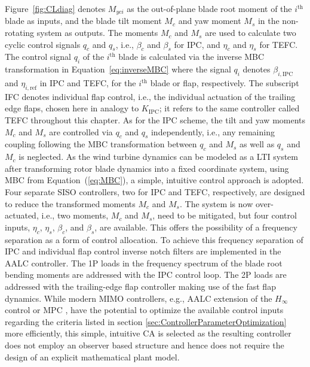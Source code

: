 Figure~\ref{fig:CLdiag} denotes $M_{yci}$ as the out-of-plane blade root moment of the $i^{\text{th}}$ blade as inputs, and the blade tilt moment $M_c$ and yaw moment $M_s$ in the non-rotating system as outputs. The moments $M_c$ and $M_s$ are used to calculate two cyclic control signals $q_c$ and $q_s$, i.e., $\beta_c$ and $\beta_s$ for IPC, and $\eta_c$ and $\eta_s$ for TEFC. The control signal $q_i$ of the $i^{\text{th}}$ blade is calculated via the inverse MBC transformation in Equation~\eqref{eq:inverseMBC} 
where the signal $q_i$ denotes $\beta_{i,\text{IPC}}$ and $\eta_{i,\text{ref}}$ in IPC and TEFC, for the $i^{\text{th}}$ blade or flap, respectively. The subscript IFC denotes individual flap control, i.e., the individual actuation of the trailing edge flaps, chosen here in analogy to $K_\mathrm{IPC}$; it refers to the same controller called TEFC throughout this chapter. As for the IPC scheme, the tilt and yaw moments $M_c$ and $M_s$ are controlled via $q_c$ and $q_s$ independently, i.e., any remaining coupling following the MBC transformation between $q_c$ and $M_s$ as well as $q_s$ and $M_c$ is neglected. As the wind turbine dynamics can be modeled as a LTI system after transforming rotor blade dynamics into a fixed coordinate system, using MBC from Equation~(\ref{eq:MBC}), a simple, intuitive control approach is adopted. Four separate SISO controllers, two for IPC and TEFC, respectively, are designed to reduce the transformed moments $M_c$ and $M_s$. The system is now over-actuated, i.e., two moments, $M_c$ and $M_s$, need to be mitigated, but four control inputs, $\eta_c$, $\eta_s$, $\beta_c$, and $\beta_s$, are available. This offers the possibility of a frequency separation as a form of control allocation. To achieve this frequency separation of IPC and individual flap control inverse notch filters are implemented in the AALC controller. The 1P loads in the frequency spectrum of the blade root bending moments are addressed with the IPC control loop. The 2P loads are addressed with the trailing-edge flap controller making use of the fast flap dynamics. While modern MIMO controllers, e.g.,  AALC extension of the $H_\infty$ control \cite{ossmann2021field,ossmann2017load} or MPC \cite{dittmer2021velocity}, have the potential to optimize the available control inputs regarding the criteria listed in section \ref{sec:ControllerParameterOptimization} more efficiently, this simple, intuitive CA is selected as the resulting controller does not employ an observer based structure and hence does not require the design of an explicit mathematical plant model.%

